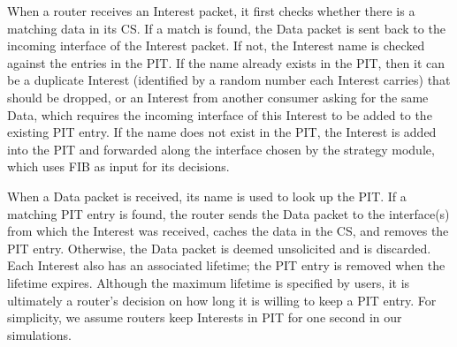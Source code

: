 When a router receives an Interest packet, it first checks whether there is a matching data in its CS.
If a match is found, the Data packet is sent back to the incoming interface of the Interest packet.
If not, the Interest name is checked against the entries in the PIT. 
If the name already exists in the PIT, then it can be a duplicate Interest (identified by a random number each Interest carries) that should be dropped,
or an Interest from another consumer asking for the same Data, which requires the incoming interface of this Interest to be added to the existing PIT entry.
If the name does not exist in the PIT, the Interest is added into the PIT and forwarded along the interface chosen by the strategy module, which uses FIB as input for its decisions.

When a Data packet is received, its name is used to look up the PIT.
If a matching PIT entry is found,
the router sends the Data packet to the interface(s) from which the Interest was received, caches the data in the CS, and removes the PIT entry.  Otherwise, the Data packet is deemed unsolicited and is discarded. 
Each Interest also has an associated lifetime; the PIT entry is removed when the lifetime expires.
Although the maximum lifetime is specified by users, it is ultimately a router's decision on how long it is willing to keep a PIT entry.  
For simplicity, we assume routers keep Interests in PIT for one second in our simulations.

